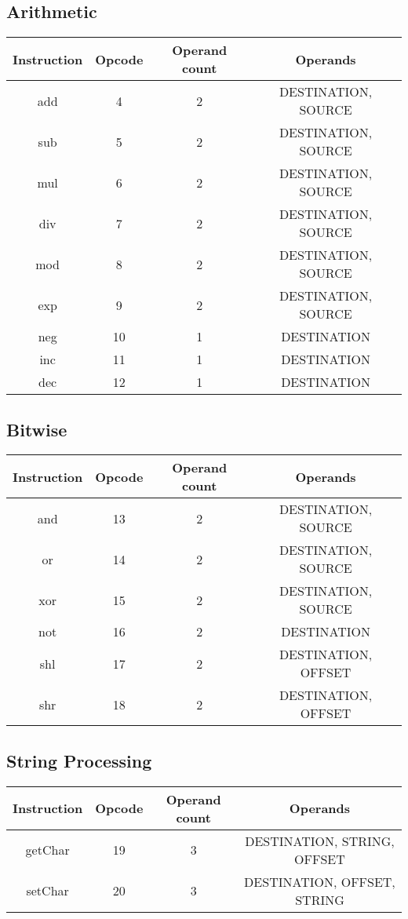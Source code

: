 \documentclass[manuscript,screen,nonacm]{acmart}
\begin{document}
\subsection{Arithmetic}
\begin{center}
\begin{tabular}{|c|c|c|c|}
    \hline
    Instruction & Opcode & Operand count & Operands \\
    \hline
    add & 4 & 2 & DESTINATION, SOURCE \\
    sub & 5 & 2 & DESTINATION, SOURCE \\
    mul & 6 & 2 & DESTINATION, SOURCE \\
    div & 7 & 2 & DESTINATION, SOURCE \\
    mod & 8 & 2 & DESTINATION, SOURCE \\
    exp & 9 & 2 & DESTINATION, SOURCE \\
    neg & 10 & 1 & DESTINATION \\
    inc & 11 & 1 & DESTINATION \\
    dec & 12 & 1 & DESTINATION \\
    \hline
\end{tabular}
\end{center}

\subsection{Bitwise}

\begin{center}
\begin{tabular}{|c|c|c|c|}
    \hline
    Instruction & Opcode & Operand count & Operands \\
    \hline
    and & 13 & 2 & DESTINATION, SOURCE \\
    or & 14 & 2 & DESTINATION, SOURCE \\
    xor & 15 & 2 & DESTINATION, SOURCE \\
    not & 16 & 2 & DESTINATION \\
    shl & 17 & 2 & DESTINATION, OFFSET \\
    shr & 18 & 2 & DESTINATION, OFFSET \\
    \hline
\end{tabular}
\end{center}

\subsection{String Processing}
\begin{center}
\begin{tabular}{|c|c|c|c|}
    \hline
    Instruction & Opcode & Operand count & Operands \\
    \hline
    getChar & 19 & 3 & DESTINATION, STRING, OFFSET \\
    setChar & 20 & 3 & DESTINATION, OFFSET, STRING \\
    \hline
\end{tabular}
\end{center}
\end{document}
